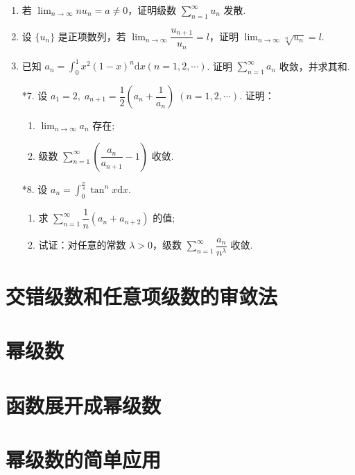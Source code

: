 \begin{enumerate}
    \item 若 $\displaystyle\lim_{n\to\infty}nu_n=a\not=0$，证明级数 $\displaystyle\sum_{n=1}^{\infty}u_n$ 发散.
    
    \item 设 $\{u_n\}$ 是正项数列，若 $\displaystyle\lim_{n\to\infty}\dfrac{u_{n+1}}{u_n}=l$，证明 $\displaystyle\lim_{n\to\infty}\sqrt[n]{u_n}=l$.
    
    \item 已知 $\displaystyle a_n=\int_0^1x^2(1-x)^n\text{d}x(n=1,2,\cdots)$. 证明 $\displaystyle\sum_{n=1}^{\infty}a_n$ 收敛，并求其和.
    
    \item[*7.] 设 $a_1=2,\;a_{n+1}=\dfrac{1}{2}\left(a_n+\dfrac{1}{a_n}\right)\;(n=1,2,\cdots)$. 证明：
    \begin{enumerate}[(1)]
        \item $\displaystyle\lim_{n\to\infty}a_n$ 存在;
        \item 级数 $\displaystyle\sum_{n=1}^{\infty}\left(\dfrac{a_n}{a_{n+1}}-1\right)$ 收敛.
    \end{enumerate}  

    \item[*8.] 设 $\displaystyle a_{n}=\int_0^{\frac{\pi}{4}}\tan^nx\text{d}x$.
    \begin{enumerate}[(1)]
        \item 求 $\displaystyle\sum_{n=1}^{\infty}\dfrac{1}{n}(a_{n}+a_{n+2})$ 的值;
        \item 试证：对任意的常数 $\lambda>0$，级数 $\displaystyle\sum_{n=1}^{\infty}\dfrac{a_n}{n^{\lambda}}$ 收敛.
    \end{enumerate} 
\end{enumerate}

\section{交错级数和任意项级数的审敛法}

\section{幂级数}

\section{函数展开成幂级数}

\section{幂级数的简单应用}

